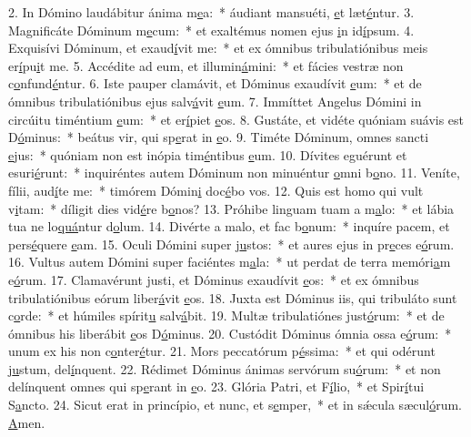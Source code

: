 2. In Dómino laudábitur ánima m\uline{e}a:~* áudiant mansuéti, \uline{e}t læt\uline{é}ntur.
3. Magnificáte Dóminum m\uline{e}cum:~* et exaltémus nomen ejus \uline{i}n id\uline{í}psum.
4. Exquisívi Dóminum, et exaud\uline{í}vit me:~* et ex ómnibus tribulatiónibus meis er\uline{í}pu\uline{i}t me.
5. Accédite ad eum, et illumin\uline{á}mini:~* et fácies vestræ non c\uline{o}nfund\uline{é}ntur.
6. Iste pauper clamávit, et Dóminus exaudívit \uline{e}um:~* et de ómnibus tribulatiónibus ejus salv\uline{á}vit \uline{e}um.
7. Immíttet Angelus Dómini in circúitu timéntium \uline{e}um:~* et er\uline{í}piet \uline{e}os.
8. Gustáte, et vidéte quóniam suávis est D\uline{ó}minus:~* beátus vir, qui sp\uline{e}rat in \uline{e}o.
9. Timéte Dóminum, omnes sancti \uline{e}jus:~* quóniam non est inópia tim\uline{é}ntibus \uline{e}um.
10. Dívites eguérunt et esuri\uline{é}runt:~* inquiréntes autem Dóminum non minuéntur \uline{o}mni b\uline{o}no.
11. Veníte, fílii, aud\uline{í}te me:~* timórem Dómin\uline{i} doc\uline{é}bo vos.
12. Quis est homo qui vult v\uline{i}tam:~* díligit dies vid\uline{é}re b\uline{o}nos?
13. Próhibe linguam tuam a m\uline{a}lo:~* et lábia tua ne lo\uline{quá}ntur d\uline{o}lum.
14. Divérte a malo, et fac b\uline{o}num:~* inquíre pacem, et pers\uline{é}quere \uline{e}am.
15. Oculi Dómini super j\uline{u}stos:~* et aures ejus in pr\uline{e}ces e\uline{ó}rum.
16. Vultus autem Dómini super faciéntes m\uline{a}la:~* ut perdat de terra memóri\uline{a}m e\uline{ó}rum.
17. Clamavérunt justi, et Dóminus exaudívit \uline{e}os:~* et ex ómnibus tribulatiónibus eórum liber\uline{á}vit \uline{e}os.
18. Juxta est Dóminus iis, qui tribuláto sunt c\uline{o}rde:~* et húmiles spírit\uline{u} salv\uline{á}bit.
19. Multæ tribulatiónes just\uline{ó}rum:~* et de ómnibus his liberábit \uline{e}os D\uline{ó}minus.
20. Custódit Dóminus ómnia ossa e\uline{ó}rum:~* unum ex his non c\uline{o}nter\uline{é}tur.
21. Mors peccatórum p\uline{é}ssima:~* et qui odérunt j\uline{u}stum, del\uline{í}nquent.
22. Rédimet Dóminus ánimas servórum su\uline{ó}rum:~* et non delínquent omnes qui sp\uline{e}rant in \uline{e}o.
23. Glória Patri, et F\uline{í}lio,~* et Spir\uline{í}tui S\uline{a}ncto.
24. Sicut erat in princípio, et nunc, et s\uline{e}mper,~* et in sǽcula sæcul\uline{ó}rum. \uline{A}men.
